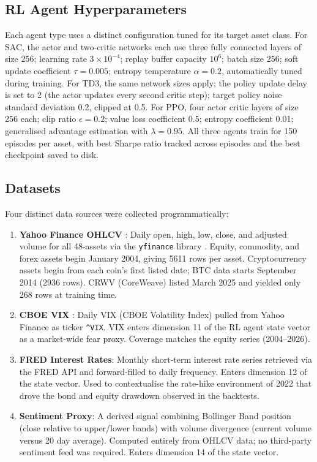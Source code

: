 \documentclass[journal]{IEEEtran}
\begin{document}
\subsection{RL Agent Hyperparameters}

Each agent type uses a distinct configuration tuned for its target asset
class. For SAC, the actor and two-critic networks each use three fully
connected layers of size 256; learning rate $3 \times 10^{-4}$; replay
buffer capacity $10^{6}$; batch size 256; soft update coefficient
$\tau = 0.005$; entropy temperature $\alpha = 0.2$, automatically tuned
during training. For TD3, the same network sizes apply; the policy update
delay is set to 2 (the actor updates every second critic step); target
policy noise standard deviation 0.2, clipped at 0.5. For PPO, four
actor critic layers of size 256 each; clip ratio $\epsilon = 0.2$;
value loss coefficient 0.5; entropy coefficient 0.01; generalised
advantage estimation with $\lambda = 0.95$. All three agents train for
150 episodes per asset, with best Sharpe ratio tracked across episodes
and the best checkpoint saved to disk.

\subsection{Datasets}

Four distinct data sources were collected programmatically:

\begin{enumerate}
\item \textbf{Yahoo Finance OHLCV} \cite{yahoo}: Daily open, high, low,
      close, and adjusted volume for all 48-assets via the
      \texttt{yfinance} library \cite{yfinance}. Equity, commodity, and
      forex assets begin January 2004, giving 5611 rows per asset.
      Cryptocurrency assets begin from each coin's first listed date;
      BTC data starts September 2014 (2936 rows). CRWV (CoreWeave)
      listed March 2025 and yielded only 268 rows at training time.

\item \textbf{CBOE VIX} \cite{yahoo}: Daily VIX (CBOE Volatility Index)
      pulled from Yahoo Finance as ticker \texttt{\^{}VIX}. VIX enters
      dimension 11 of the RL agent state vector as a market-wide fear
      proxy. Coverage matches the equity series (2004--2026).

\item \textbf{FRED Interest Rates}: Monthly short-term interest rate
      series retrieved via the FRED API and forward-filled to daily
      frequency. Enters dimension 12 of the state vector. Used to
      contextualise the rate-hike environment of 2022 that drove the
      bond and equity drawdown observed in the backtests.

\item \textbf{Sentiment Proxy}: A derived signal combining Bollinger
      Band position (close relative to upper/lower bands) with volume
      divergence (current volume versus 20 day average). Computed
      entirely from OHLCV data; no third-party sentiment feed was
      required. Enters dimension 14 of the state vector.
\end{enumerate}
\end{document}
